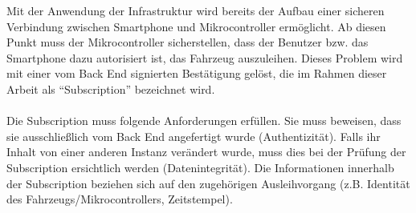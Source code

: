 Mit der Anwendung der Infrastruktur wird bereits der Aufbau einer sicheren Verbindung zwischen Smartphone und Mikrocontroller ermöglicht. Ab diesen Punkt muss der Mikrocontroller sicherstellen, dass der Benutzer bzw. das Smartphone dazu autorisiert ist, das Fahrzeug auszuleihen. Dieses Problem wird mit einer vom Back End signierten Bestätigung gelöst, die im Rahmen dieser Arbeit als "`Subscription"' bezeichnet wird.
\\\\
Die Subscription muss folgende Anforderungen erfüllen. Sie muss beweisen, dass sie ausschließlich vom Back End angefertigt wurde (Authentizität). Falls ihr Inhalt von einer anderen Instanz verändert wurde, muss dies bei der Prüfung der Subscription ersichtlich werden (Datenintegrität). Die Informationen innerhalb der Subscription beziehen sich auf den zugehörigen Ausleihvorgang (z.B. Identität des Fahrzeugs/Mikrocontrollers, Zeitstempel).